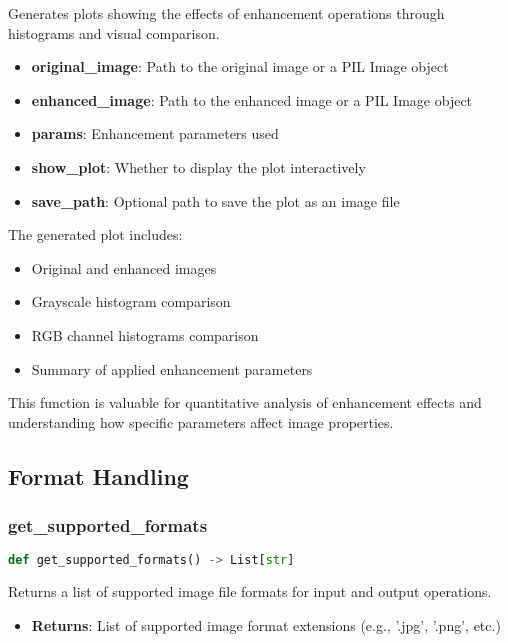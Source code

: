 Generates plots showing the effects of enhancement operations through histograms and visual comparison.

\begin{itemize}
  \item \textbf{original\_image}: Path to the original image or a PIL Image object
  \item \textbf{enhanced\_image}: Path to the enhanced image or a PIL Image object
  \item \textbf{params}: Enhancement parameters used
  \item \textbf{show\_plot}: Whether to display the plot interactively
  \item \textbf{save\_path}: Optional path to save the plot as an image file
\end{itemize}

The generated plot includes:
\begin{itemize}
  \item Original and enhanced images
  \item Grayscale histogram comparison
  \item RGB channel histograms comparison
  \item Summary of applied enhancement parameters
\end{itemize}

This function is valuable for quantitative analysis of enhancement effects and understanding how specific parameters affect image properties.

\subsection{Format Handling}

\subsubsection{get\_supported\_formats}
\begin{lstlisting}[language=Python]
def get_supported_formats() -> List[str]
\end{lstlisting}

Returns a list of supported image file formats for input and output operations.

\begin{itemize}
  \item \textbf{Returns}: List of supported image format extensions (e.g., '.jpg', '.png', etc.)
\end{itemize}

